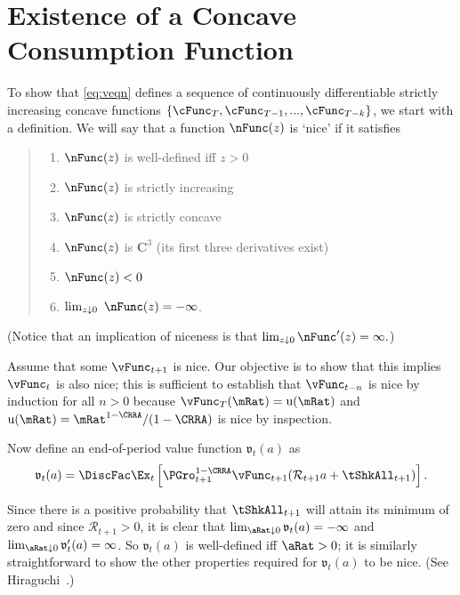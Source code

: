 \documentclass[titlepage]{\econtex}\providecommand{\texname}{BufferStockTheory}
\providecommand{\ApndxDir}{Appendices}
\begin{document}


\section{Existence of a Concave Consumption Function}\label{sec:ApndxcExists}

To show that \eqref{eq:veqn} defines a sequence of continuously
differentiable strictly increasing concave functions
$\{\cFunc_{T},\cFunc_{T-1},...,\cFunc_{T-k}\}$, we start with a
definition.  We will say that a function $\nFunc(z)$ is `nice' if it
satisfies
\begin{quote}
\begin{enumerate}\setlength{\itemsep}{0.0ex}
\item $\nFunc(z)$ is well-defined iff $z>0$

\item $\nFunc(z)$ is strictly increasing

\item $\nFunc(z)$ is strictly concave

\item $\nFunc(z)$ is $ \mathbf{C}^{3}$ (its first three derivatives exist)

\item $\nFunc(z)<0$

\item $\lim_{z\downarrow 0}~\nFunc(z) =-\infty $.

\end{enumerate}
\end{quote}

(Notice that an implication of niceness is that $\lim_{z \downarrow 0} \nFunc^{\prime}(z) = \infty.$)

Assume that some $\vFunc_{t+1}$ is nice.  Our objective is to show that this
implies $\vFunc_{t}$ is also nice; this is sufficient to establish that
$\vFunc_{t-n}$ is nice by induction for all $n > 0$ because $\vFunc_{T}(\mRat)
=\util(\mRat) $ and $\util(\mRat)=\mRat^{1-\CRRA}/(1-\CRRA)$ is nice by inspection.

Now define an end-of-period value function $\mathfrak{v}_{t}(a) $ as
\begin{equation}
\mathfrak{v}_{t}(a) =\DiscFac \Ex_{t}\left[{\PGro}_{t+1}^{1-\CRRA}\vFunc_{t+1}( {\mathcal{R}}_{t+1} a+{\tShkAll}_{t+1}) \right]. \label{eq:vEnd}
\end{equation}

Since there is a positive probability that $\tShkAll_{t+1}$ will
attain its minimum of zero and since $\mathcal{R}_{t+1}>0$, it
is clear that $\lim_{\aRat \downarrow 0} \mathfrak{v}_{t}(a) = -\infty$
and $\lim_{\aRat \downarrow 0} \mathfrak{v}^{\prime}_{t}(a) = \infty$.  So
$\mathfrak{v}_{t}(a) $ is well-defined iff $\aRat>0$; it is similarly
straightforward to show the other properties required for $\mathfrak{v}_{t}(a) $ to
be nice.  (See Hiraguchi~\citeyearpar{hiraguchiBSProofs}.)
\end{document}
